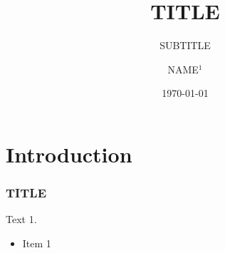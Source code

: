 \documentclass[12pt, dvipdfmx]{beamer}
\begin{document}
\title{TITLE}
\subtitle{SUBTITLE}
\author{NAME$^{1}$}
\date{\today}

\frame{\titlepage}

\section{Introduction}

\begin{frame}[fragile]
\frametitle{TITLE}
Text 1.\pause
\begin{itemize}
  \item Item 1
\end{itemize}
\vspace{3mm}
\end{frame}
\end{document}
